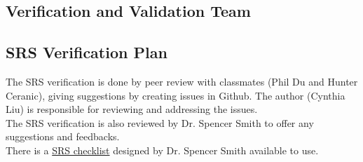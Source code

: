 \documentclass[12pt, titlepage]{article}
\begin{document}

\subsection{Verification and Validation Team}\label{VnVT}


\begin{table}[h]
\centering
{}
\caption{Verification and Validation Team}
\label{Table:VnVT}
\end{table}


\subsection{SRS Verification Plan}\label{SRSVP}
The SRS verification is done by peer review with classmates (Phil Du and Hunter Ceranic), giving suggestions by creating issues in Github. The author (Cynthia Liu) is responsible for reviewing and addressing the issues.\\
The SRS verification is also reviewed by Dr. Spencer Smith to offer any suggestions and feedbacks.\\
There is a \href{https://github.com/CynthiaLiu0805/BridgeCorrosion/blob/main/docs/Checklists/SRS-Checklist.pdf}{SRS checklist} designed by Dr. Spencer Smith available to use.
\end{document}
